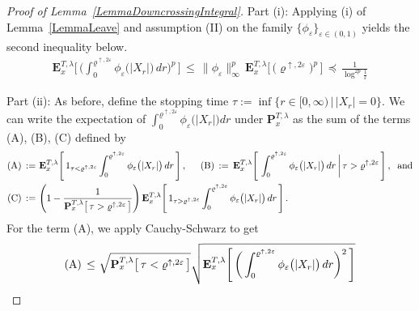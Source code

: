 \documentclass[10pt]{article}
\numberwithin{equation}{section}
\theoremstyle{definition}
\begin{document}
\begin{proof} [Proof of Lemma~\ref{LemmaDowncrossingIntegral}] Part (i): Applying (i) of Lemma~\ref{LemmaLeave} and assumption (II) on the family $\{ \phi_{\varepsilon}\}_{\varepsilon\in (0,1)}$ yields the second inequality below.
\begin{align*}
 \mathbf{E}^{T ,\lambda}_{x}\Bigg[\, \bigg(\int_{ 0}^{\varrho^{\uparrow,2\varepsilon} }      \phi_{\varepsilon}\big(|X_r|\big)\,dr\bigg)^p \, \Bigg] \,\leq \, \big\|  \phi_{\varepsilon}\big\|_{\infty}^p\,\mathbf{E}^{T ,\lambda}_{x}\Big[ \,\big(\varrho^{\uparrow,2\varepsilon}\big)^p \, \Big] \,\preceq \,\frac{1}{\log^{2p}\frac{1}{\varepsilon} }
\end{align*}


\vspace{.2cm}

\noindent Part (ii): As before, define the stopping time $\tau :=\inf\big\{r\in [0,\infty)\,\big|\, |X_r|=0   \big\}   $. We can write the expectation of $\int_{ 0}^{\varrho^{\uparrow,2\varepsilon} }      \phi_{\varepsilon}\big(|X_r|\big)dr  $ under $\mathbf{P}^{T ,\lambda}_{x}$  as the sum of the terms (A), (B),  (C) defined by
\begin{align*}
 \textup{(A)}\,:=\,&\, \mathbf{E}^{T,\lambda}_{x}\Bigg[\, 1_{  \tau < \varrho^{\uparrow,2\varepsilon} }\int_{ 0}^{\varrho^{\uparrow,2\varepsilon} }      \phi_{\varepsilon}\big(|X_r|\big)\,dr  \,\Bigg]\,,
\hspace{.5cm}  \textup{(B)}\,:=\,\mathbf{E}^{T,\lambda}_{x}\Bigg[ \,\int_{ 0}^{\varrho^{\uparrow,2\varepsilon} }      \phi_{\varepsilon}\big(|X_r|\big)\,dr \,\bigg|\, \tau > \varrho^{\uparrow,2\varepsilon}  \, \Bigg]\,, \hspace{.2cm} \text{and} \\ \textup{(C)}\,:=\,&\,\Bigg(1-\frac{1 }{  \mathbf{P}^{T,\lambda}_{x}\big[ \, \tau >\varrho^{\uparrow, 2\varepsilon}   \, \big] } \Bigg)\, \mathbf{E}^{T,\lambda}_{x}\Bigg[\, 1_{  \tau > \varrho^{\uparrow,2\varepsilon}  } \int_{ 0}^{\varrho^{\uparrow,2\varepsilon} }      \phi_{\varepsilon}\big(|X_r|\big)\,dr \,\Bigg]\,. \nonumber  \\
\end{align*}
 For the  term (A), we apply Cauchy-Schwarz to get
\begin{align}\label{Pip1}
  \textup{(A)}\,\leq \, &\, \sqrt{\mathbf{P}^{T,\lambda}_{x}\big[\, \tau < \varrho^{\uparrow,2\varepsilon} \,\big] }   \sqrt{\mathbf{E}^{T,\lambda}_{x}\Bigg[ \, \bigg(\int_{ 0}^{\varrho^{\uparrow,2\varepsilon} }      \phi_{\varepsilon}\big(|X_r|\big)\,dr  \bigg)^2 \,\Bigg] } \nonumber \\

\end{align}
\end{proof}
\end{document}

